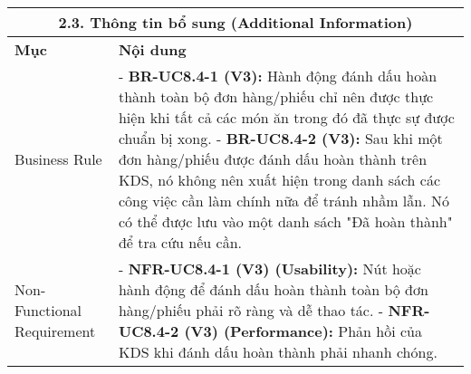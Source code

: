 \begin{longtable}{|m{4cm}|p{11cm}|}
\hline
\multicolumn{2}{|c|}{\textbf{2.3. Thông tin bổ sung (Additional Information)}} \\
\hline
\textbf{Mục} & \textbf{Nội dung} \\
\hline
Business Rule & - \textbf{BR-UC8.4-1 (V3):} Hành động đánh dấu hoàn thành toàn bộ đơn hàng/phiếu chỉ nên được thực hiện khi tất cả các món ăn trong đó đã thực sự được chuẩn bị xong. \newline - \textbf{BR-UC8.4-2 (V3):} Sau khi một đơn hàng/phiếu được đánh dấu hoàn thành trên KDS, nó không nên xuất hiện trong danh sách các công việc cần làm chính nữa để tránh nhầm lẫn. Nó có thể được lưu vào một danh sách "Đã hoàn thành" để tra cứu nếu cần. \\
\hline
Non-Functional Requirement & - \textbf{NFR-UC8.4-1 (V3) (Usability):} Nút hoặc hành động để đánh dấu hoàn thành toàn bộ đơn hàng/phiếu phải rõ ràng và dễ thao tác. \newline - \textbf{NFR-UC8.4-2 (V3) (Performance):} Phản hồi của KDS khi đánh dấu hoàn thành phải nhanh chóng. \\
\hline
\end{longtable}

